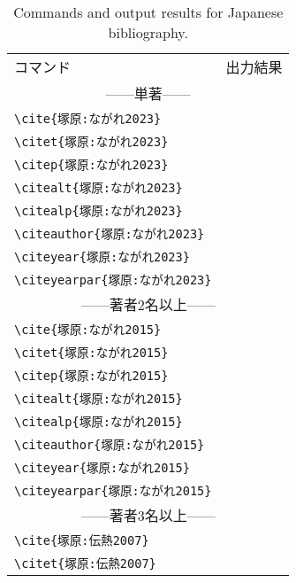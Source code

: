 \documentclass[a4paper,fleqn,12pt,uplatex]{jsarticle}
\begin{document}
\begin{table}[t]
    \centering
    \caption{Commands and output results for Japanese bibliography.}
    \label{tab:Japanese}
    \begin{tabular}{ll}
        コマンド &出力結果 \\
        \multicolumn{2}{c}{------単著------} \\
        \verb|\cite{塚原:ながれ2023}|            &\cite{塚原:ながれ2023} \\
        \verb|\citet{塚原:ながれ2023}|           &\citet{塚原:ながれ2023} \\
        \verb|\citep{塚原:ながれ2023}|           &\citep{塚原:ながれ2023} \\
        \verb|\citealt{塚原:ながれ2023}|         &\citealt{塚原:ながれ2023} \\
        \verb|\citealp{塚原:ながれ2023}|         &\citealp{塚原:ながれ2023} \\
        \verb|\citeauthor{塚原:ながれ2023}|      &\citeauthor{塚原:ながれ2023} \\
        \verb|\citeyear{塚原:ながれ2023}|        &\citeyear{塚原:ながれ2023} \\
        \verb|\citeyearpar{塚原:ながれ2023}|     &\citeyearpar{塚原:ながれ2023} \\
        \multicolumn{2}{c}{------著者2名以上------} \\
        \verb|\cite{塚原:ながれ2015}|            &\cite{塚原:ながれ2015} \\
        \verb|\citet{塚原:ながれ2015}|           &\citet{塚原:ながれ2015} \\
        \verb|\citep{塚原:ながれ2015}|           &\citep{塚原:ながれ2015} \\
        \verb|\citealt{塚原:ながれ2015}|         &\citealt{塚原:ながれ2015} \\
        \verb|\citealp{塚原:ながれ2015}|         &\citealp{塚原:ながれ2015} \\
        \verb|\citeauthor{塚原:ながれ2015}|      &\citeauthor{塚原:ながれ2015} \\
        \verb|\citeyear{塚原:ながれ2015}|        &\citeyear{塚原:ながれ2015} \\
        \verb|\citeyearpar{塚原:ながれ2015}|     &\citeyearpar{塚原:ながれ2015} \\
        \multicolumn{2}{c}{------著者3名以上------} \\
        \verb|\cite{塚原:伝熱2007}|             &\cite{塚原:伝熱2007} \\
        \verb|\citet{塚原:伝熱2007}|            &\citet{塚原:伝熱2007} \\

\end{tabular}
\end{table}
\end{document}
